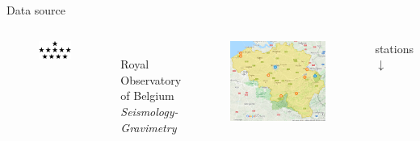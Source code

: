 \documentclass{beamer}
\begin{document}
\begin{frame}{Data source}
	\begin{columns}[c]
		\begin{columns}[c]
			\begin{figure}
				\includegraphics[width=\linewidth,clip=true]{slides_files/ROB-logo}
			\end{figure}
			\vspace{.4em}\\
			\small Royal Observatory of Belgium\\\scriptsize\textit{Seismology-Gravimetry}
		\end{columns}
		\begin{figure}
			\includegraphics[width=.8\linewidth]{slides_files/stations-map-smol-2}
		\end{figure}
		 stations
		\\\vspace{.3em}$\downarrow$

\end{columns}
\end{frame}
\end{document}
